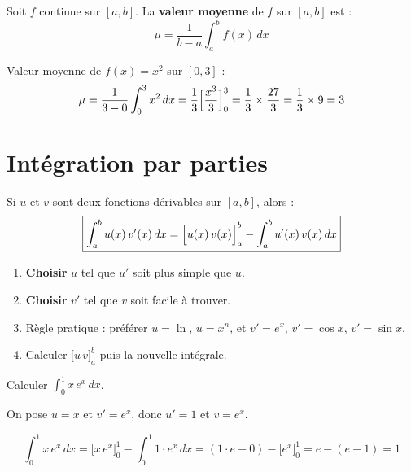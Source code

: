 \begin{definition}
  Soit $f$ continue sur $[a,b]$.
  La \textbf{valeur moyenne} de $f$ sur $[a,b]$ est :
  \[
    \mu = \frac{1}{b-a}\int_a^b f(x)\,dx
  \]
\end{definition}

\begin{exemple}[R\'{e}solu]
  Valeur moyenne de $f(x) = x^2$ sur $[0,3]$ :
  \[
    \mu = \frac{1}{3-0}\int_0^3 x^2\,dx
        = \frac{1}{3}\Bigl[\frac{x^3}{3}\Bigr]_0^3
        = \frac{1}{3} \times \frac{27}{3}
        = \frac{1}{3} \times 9 = 3
  \]
\end{exemple}

\section{Int\'{e}gration par parties}

\begin{theoreme}
  Si $u$ et $v$ sont deux fonctions d\'{e}rivables sur $[a,b]$, alors :
  \[
    \boxed{\int_a^b u(x)\,v'(x)\,dx
    = \Bigl[u(x)\,v(x)\Bigr]_a^b - \int_a^b u'(x)\,v(x)\,dx}
  \]
\end{theoreme}

\begin{methode}
  \begin{enumerate}
    \item \textbf{Choisir} $u$ tel que $u'$ soit plus simple que $u$.
    \item \textbf{Choisir} $v'$ tel que $v$ soit facile \`{a} trouver.
    \item R\`{e}gle pratique : pr\'{e}f\'{e}rer $u = \ln$, $u = x^n$,
          et $v' = e^x$, $v' = \cos x$, $v' = \sin x$.
    \item Calculer $\bigl[u\,v\bigr]_a^b$ puis la nouvelle int\'{e}grale.
  \end{enumerate}
\end{methode}

\begin{exemple}
  Calculer $\displaystyle\int_0^1 x\,e^x\,dx$.

  \medskip
  On pose $u = x$ et $v' = e^x$,
  donc $u' = 1$ et $v = e^x$.

  \[
    \int_0^1 x\,e^x\,dx
    = \bigl[x\,e^x\bigr]_0^1 - \int_0^1 1 \cdot e^x\,dx
    = (1 \cdot e - 0) - \bigl[e^x\bigr]_0^1
    = e - (e - 1) = 1
  \]
\end{exemple}

